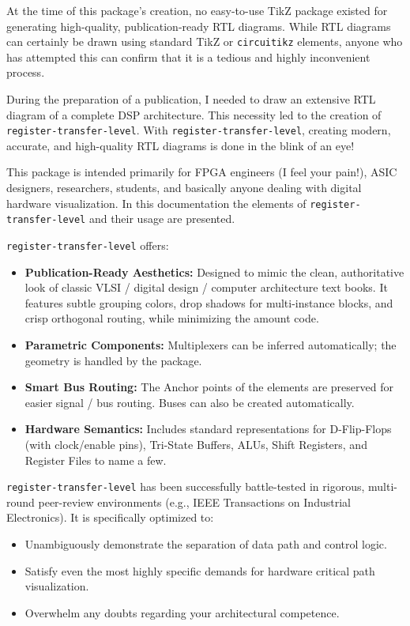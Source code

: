 At the time of this package's creation, no easy-to-use TikZ package existed for generating high-quality, publication-ready RTL diagrams. While RTL diagrams can certainly be drawn using standard TikZ or \texttt{circuitikz} elements, anyone who has attempted this can confirm that it is a tedious and highly inconvenient process.

During the preparation of a publication, I needed to draw an extensive RTL diagram of a complete DSP architecture. This necessity led to the creation of \texttt{register-transfer-level}. With \texttt{register-transfer-level}, creating modern, accurate, and high-quality RTL diagrams is done in the blink of an eye!

This package is intended primarily for FPGA engineers (I feel your pain!), ASIC designers, researchers, students, and basically anyone dealing with digital hardware visualization.
In this documentation the elements of \texttt{register-transfer-level} and their usage are presented.

 \texttt{register-transfer-level} offers:
\begin{itemize}
	\item \textbf{Publication-Ready Aesthetics:}
	      Designed to mimic the clean, authoritative look of classic VLSI / digital design / computer architecture text books. It features subtle grouping colors, drop shadows for multi-instance blocks, and crisp orthogonal routing, while minimizing the amount code.
	\item \textbf{Parametric Components:}
	      Multiplexers can be inferred automatically; the geometry is handled by the package.
	\item \textbf{Smart Bus Routing:}
	      The Anchor points of the elements are preserved for easier signal / bus routing. Buses can also be created automatically.
	\item \textbf{Hardware Semantics:}
	      Includes standard representations for D-Flip-Flops (with clock/enable pins), Tri-State Buffers, ALUs, Shift Registers, and Register Files to name a few.
\end{itemize}

\texttt{register-transfer-level} has been successfully battle-tested in rigorous, multi-round peer-review environments (e.g., IEEE Transactions on Industrial Electronics). It is specifically optimized to:
\begin{itemize}
	\item Unambiguously demonstrate the separation of data path and control logic.
	\item Satisfy even the most highly specific demands for hardware critical path visualization.
	\item Overwhelm any doubts regarding your architectural competence.
\end{itemize}

